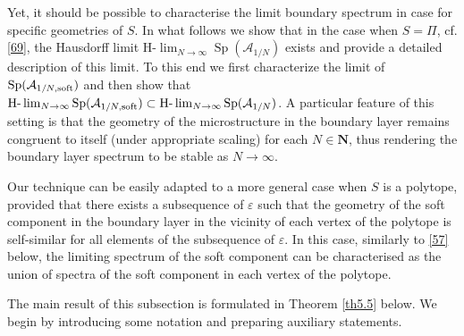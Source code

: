 \documentclass[11pt]{article}
\newcommand\e {\varepsilon}
\def\AA{\mathcal{A}}
\DeclareMathOperator{\Sp}{Sp}
\newcommand\N{\mathbf{N}}
\theoremstyle{remark}
\begin{document}
Yet, it should be possible to characterise the limit boundary spectrum in case for specific geometries of $S$.  
In what follows we show that in the case when $S =\Pi$, cf. \eqref{69}, the Hausdorff limit $\text{H-}\lim_{N\to \infty} \Sp (\mathcal{A}_{1/N})$ exists and  provide a detailed description of this limit. To this end we first characterize the limit of $\Sp (\AA_{1/N,\rm soft})$ and then show that $\text{H-}\lim_{N \to \infty} \Sp (\AA_{1/N,\rm soft}) \subset \text{H-}\lim_{N\to \infty} \Sp (\mathcal{A}_{1/N})$. A particular feature of this setting is that the geometry of the microstructure in the boundary layer remains congruent to itself (under appropriate scaling) for each $N\in \N$, thus rendering the boundary layer spectrum to be stable as $N\to \infty$.

Our technique can be easily adapted to a more general case when $S$ is a polytope, provided that there exists a subsequence of $\e$ such that the geometry of the soft component in  the boundary layer in the vicinity of each vertex of the polytope is self-similar for all elements of the subsequence of $\e$.   In this case, similarly to \eqref{57} below, the limiting spectrum of the soft component can be characterised as the union of spectra of the soft component in each vertex of the polytope. 






 The main result of this subsection is formulated in  Theorem \ref{th5.5} below. We begin by introducing some notation and preparing auxiliary statements.
\end{document}
